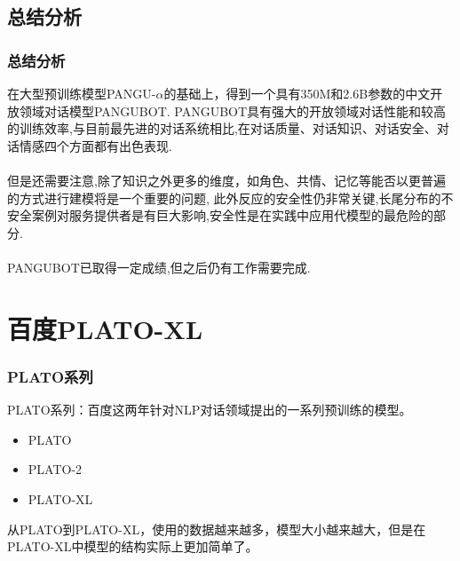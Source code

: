 \documentclass{beamer}
\begin{document}
\subsection{总结分析}
\begin{frame}
    \frametitle{总结分析}
    在大型预训练模型PANGU-$\alpha$的基础上，得到一个具有350M和2.6B参数的中文开放领域对话模型PANGUBOT.
    PANGUBOT具有强大的开放领域对话性能和较高的训练效率,与目前最先进的对话系统相比,在对话质量、对话知识、对话安全、对话情感四个方面都有出色表现.
    \\ \hspace*{\fill} \\
    但是还需要注意,除了知识之外更多的维度，如角色、共情、记忆等能否以更普遍的方式进行建模将是一个重要的问题,
    此外反应的安全性仍非常关键,长尾分布的不安全案例对服务提供者是有巨大影响,安全性是在实践中应用代模型的最危险的部分.
    \\ \hspace*{\fill} \\
    PANGUBOT已取得一定成绩,但之后仍有工作需要完成.

\end{frame}




\section{百度PLATO-XL}
\begin{frame}
    \frametitle{PLATO系列}

    PLATO系列：百度这两年针对NLP对话领域提出的一系列预训练的模型。

    \begin{itemize}
        \item PLATO
        \item PLATO-2
        \item PLATO-XL
    \end{itemize}

    从PLATO到PLATO-XL，使用的数据越来越多，模型大小越来越大，但是在PLATO-XL中模型的结构实际上更加简单了。
\end{frame}
\end{document}
